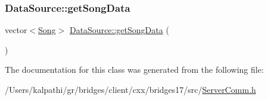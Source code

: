 \subsubsection{\texorpdfstring{Data\+Source\+::get\+Song\+Data}{DataSource::getSongData}}
{\footnotesize\ttfamily vector$<$\mbox{\hyperlink{classbridges_1_1_song}{Song}}$>$ \mbox{\hyperlink{namespacebridges_1_1_data_source_a325b6f25041e833bc2fd561bd2c2ee6e}{Data\+Source\+::get\+Song\+Data}} (\begin{DoxyParamCaption}{ }\end{DoxyParamCaption})\hspace{0.3cm}{\ttfamily [friend]}}



The documentation for this class was generated from the following file\+:\begin{DoxyCompactItemize}
\item 
/\+Users/kalpathi/gr/bridges/client/cxx/bridges17/src/\mbox{\hyperlink{_server_comm_8h}{Server\+Comm.\+h}}\end{DoxyCompactItemize}
